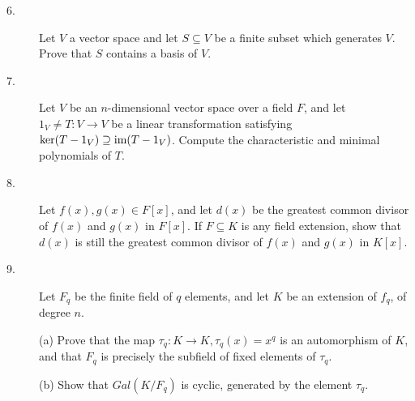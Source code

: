 \documentclass{article}
\begin{document}
\begin{description}
\item[6.]
Let $V$ a vector space and let $S \subseteq V$ be a finite subset which
generates $V$. Prove that $S$ contains a basis of $V$.

\item[7.]
Let $V$ be an $n$-dimensional vector space over a field $F$, and let
$1_V \neq T: V \to V$ be a linear transformation satisfying
$\ker(T-1_V) \supseteq \hbox{im} (T-1_V)$. Compute the characteristic and minimal
polynomials of $T$.

\item[8.]
Let $f(x), g(x) \in F[x]$, and let $d(x)$ be the greatest common divisor
of $f(x)$ and $g(x)$ in $F[x]$. If $F \subseteq K$ is any field extension,
show that $d(x)$ is still the greatest common divisor of $f(x)$ and $g(x)$ in
$K[x]$.

\item[9.]
Let $F_q$ be the finite field of $q$ elements, and let $K$ be an extension of
$f_q$, of degree $n$.

\item[\quad] (a)
Prove that the map $\tau_q : K \to K, \tau_q (x) = x^q$ is an automorphism
of $K$, and that $F_q$ is precisely the subfield of fixed elements of
$\tau_q$.

\item[\quad] (b)
Show that $Gal(K/F_q)$ is cyclic, generated by the element $\tau_q$.





\end{description}    
\end{document}
